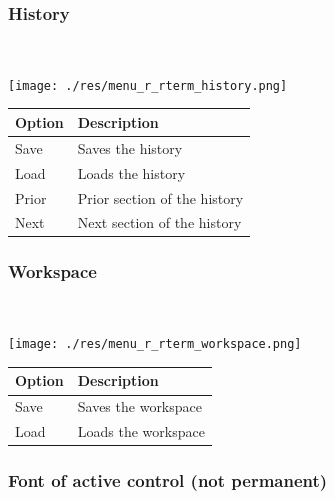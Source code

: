 \hypertarget{menu_r_rterm_history}{}
\subsubsection{History}\\

\texttt{[image: ./res/menu\_r\_rterm\_history.png]}\\

\begin{scriptsize}
  \begin{tabularx}{\textwidth}{>{\hsize=0.3\hsize}X>{\hsize=0.7\hsize}X}\\
    \hline
    \textbf{Option} & \textbf{Description} \\
    \hline
    Save & Saves the history \\
    Load & Loads the history \\
    Prior & Prior section of the history \\
    Next & Next section of the history \\
    \hline
  \end{tabularx}
\end{scriptsize}


\hypertarget{menu_r_rterm_workspace}{}
\subsubsection{Workspace}\\

\texttt{[image: ./res/menu\_r\_rterm\_workspace.png]}\\

\begin{scriptsize}
  \begin{tabularx}{\textwidth}{>{\hsize=0.3\hsize}X>{\hsize=0.7\hsize}X}\\
    \hline
    \textbf{Option} & \textbf{Description} \\
    \hline
    Save & Saves the workspace \\
    Load & Loads the workspace \\
    \hline
  \end{tabularx}
\end{scriptsize}


\hypertarget{menu_r_rterm_fontsize}{}
\subsubsection{Font of active control (not permanent)}\\

